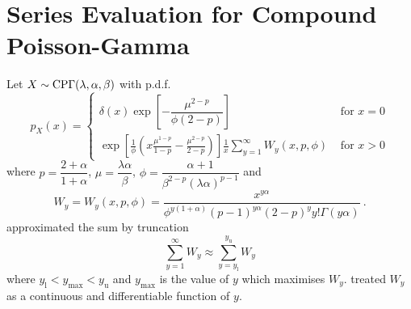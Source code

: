\section{Series Evaluation for Compound Poisson-Gamma}
\label{chapter:appendix_compoundPoissonSeries}

Let $X\sim\operatorname{CP\Gamma}(\lambda,\alpha,\beta)$ with p.d.f.
\begin{equation*}
  p_X(x) = 
  \begin{cases}
    \delta(x) \exp
      \left[
          -\dfrac{\mu^{2-p}}{\phi(2-p)}
      \right] 
    &\text{ for } x=0
    \\ 
    \displaystyle
    \exp\left[
      \frac{1}{\phi}
      \left(
        x\frac{\mu^{1-p}}{1-p}-\frac{\mu^{2-p}}{2-p}
      \right)
    \right]
    \frac{1}{x}
    \sum_{y=1}^{\infty}W_y(x,p,\phi)
    &\text{ for } x>0
  \end{cases}
\end{equation*}
where $p=\dfrac{2+\alpha}{1+\alpha}$, $\mu=\dfrac{\lambda\alpha}{\beta}$, $\phi = \dfrac{\alpha+1}{\beta^{2-p}(\lambda\alpha)^{p-1}}$ and
\begin{equation}
  W_y = W_y(x,p,\phi)=\frac{x^{y\alpha}}{\phi^{y(1+\alpha)}(p-1)^{y\alpha}(2-p)^yy!\Gamma(y\alpha)}
  \ .
\end{equation}
\cite{dunn2005series} approximated the sum by truncation
\begin{equation}
  \sum_{y=1}^\infty W_y \approx \sum_{y=y_\text{l}}^{y_\text{u}}W_y
\end{equation}
where $y_\text{l}<y_{\text{max}}<y_\text{u}$ and $y_{\text{max}}$ is the value of $y$ which maximises $W_y$. \cite{dunn2005series} treated $W_y$ as a continuous and differentiable function of $y$.


